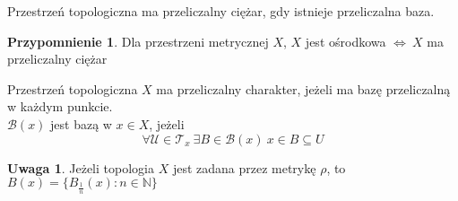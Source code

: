 \documentclass[twoside,10pt]{article}
\theoremstyle{definition}
\theoremstyle{definition}
\theoremstyle{definition}
\theoremstyle{definition}
\theoremstyle{remark}
\theoremstyle{definition}
\newtheorem*{uw}{Uwaga}
\theoremstyle{definition}
\theoremstyle{definition}
\theoremstyle{definition}
\theoremstyle{definition}
\theoremstyle{definition}
\newtheorem*{przyp}{Przypomnienie}
\begin{document}
\begin{df} Przestrzeń topologiczna ma przeliczalny ciężar, gdy istnieje przeliczalna baza. \end{df} 
\begin{przyp} Dla przestrzeni metrycznej $X$, $X$ jest ośrodkowa $\Leftrightarrow \ X$ ma przeliczalny ciężar
\end{przyp}
\begin{df} 
    Przestrzeń topologiczna $X$ ma przeliczalny charakter, jeżeli ma bazę przeliczalną w każdym punkcie. \\[5mm]
    $\mathcal B(x)$ jest bazą w $x \in X$, jeżeli 
    \[ \forall \mathcal U \in \mathcal T_x \ \exists B \in \mathcal B(x) \ x \in B \subseteq U \]
\end{df} 
\begin{uw} Jeżeli topologia $X$ jest zadana przez metrykę $\rho$, to $B(x) = \{ B_{\frac{1}{n}} (x): n \in \mathbb N \}$ \end{uw} 
\end{document}
